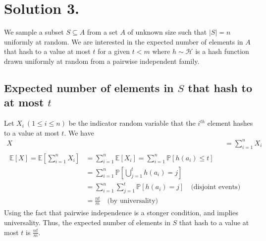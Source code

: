 \documentclass[9pt]{article}
\newcommand{\Probability}[1]{\mathbb{P}\left[ #1 \right]}
\newcommand{\Expectation}[1]{\mathbb{E}\left[ #1 \right]}
\begin{document}
\section*{\textbf{Solution 3.}}
We sample a subset $S \subseteq A$ from a set $A$ of unknown size such that $|S| = n$
uniformly at random. We are interested in the expected number of elements in $A$ that
hash to a value at most $t$ for a given $t < m$ where $h \sim \mathcal{H}$ is a hash
function drawn uniformly at random from a pairwise independent family.

\subsection*{\textbf{Expected number of elements in $S$ that hash to at most $t$}}
Let $X_{i} \ (1 \leq i \leq n)$ be the indicator random variable that the $i^{th}$
element hashes to a value at most $t$. We have
\begin{align}
    X &= \sum_{i=1}^{n} X_{i} \\
    \label{eq:exp-A}
    \begin{split}
        \Expectation{X} = \Expectation{\sum_{i=1}^{n} X_{i}}
        &= \sum_{i=1}^{n} \Expectation{X_{i}}
        = \sum_{i=1}^{n} \Probability{h(a_{i}) \leq t} \\
        &= \sum_{i=1}^{n} \Probability{\bigcup_{j=1}^{t} h(a_{i}) = j} \\
        &= \sum_{i=1}^{n} \sum_{j=1}^{t} \Probability{h(a_{i}) = j}
        \quad \text{(disjoint events)} \\
        &= \frac{nt}{m} \quad \text{(by universality)}
    \end{split}
\end{align}
Using the fact that pairwise independence is a stonger condition, and implies
universality. Thus, the expected number of elements in $S$ that hash to a value at
most $t$ is $\frac{nt}{m}$.
\end{document}
